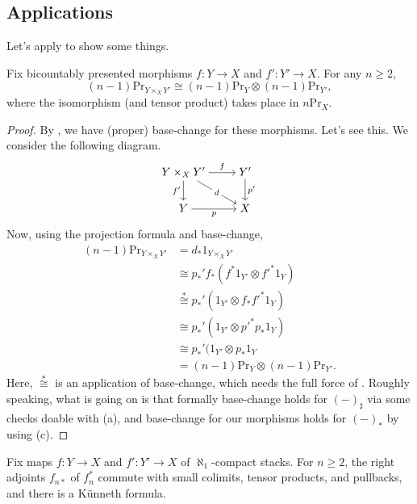 \documentclass[../notes.tex]{subfiles}
\begin{document}
\subsection{Applications}
Let's apply  to show some things.
\begin{corollary}[K\"unneth]
	Fix bicountably presented morphisms $f\colon Y\to X$ and $f'\colon Y'\to X$. For any $n\ge2$,
	\[(n-1)\mathrm{Pr}_{Y\times_XY'}\cong(n-1)\mathrm{Pr}_Y\otimes(n-1)\mathrm{Pr}_{Y'},\]
	where the isomorphism (and tensor product) takes place in $n\mathrm{Pr}_X$.
\end{corollary}
\begin{proof}
	By , we have (proper) base-change for these morphisms. Let's see this. We consider the following diagram.
	\[\begin{tikzcd}[cramped]
		{Y\times_XY'} & {Y'} \\
		Y & X
		\arrow["f", from=1-1, to=1-2]
		\arrow["{f'}"', from=1-1, to=2-1]
		\arrow["d"{description}, from=1-1, to=2-2]
		\arrow["{p'}", from=1-2, to=2-2]
		\arrow["p"', from=2-1, to=2-2]
	\end{tikzcd}\]
	Now, using the projection formula and base-change,
	\begin{align*}
		(n-1)\mathrm{Pr}_{Y\times_XY'} &= d_*1_{Y\times_XY'} \\
		&\cong p_*'f_*(f^*1_{Y'}\otimes {f'}^*1_Y) \\
		&\stackrel*\cong p_*'(1_{Y'}\otimes f_*{f'}^*1_Y) \\
		&\cong p_*'(1_{Y'}\otimes{p'}^*p_*1_Y) \\
		&\cong p_*'(1_{Y'}\otimes p_*1_Y \\
		&= (n-1)\mathrm{Pr}_Y\otimes(n-1)\mathrm{Pr}_{Y'}.
	\end{align*}
	Here, $\stackrel*\cong$ is an application of base-change, which needs the full force of . Roughly speaking, what is going on is that formally base-change holds for $(-)_\sharp$ via some checks doable with (a), and base-change for our morphisms holds for $(-)_*$ by using (c).
\end{proof}
\begin{corollary}
	Fix maps $f\colon Y\to X$ and $f'\colon Y'\to X$ of $\aleph_1$-compact stacks. For $n\ge2$, the right adjoints $f_{n*}$ of $f_n^*$ commute with small colimits, tensor products, and pullbacks, and there is a K\"unneth formula.
\end{corollary}
\end{document}
